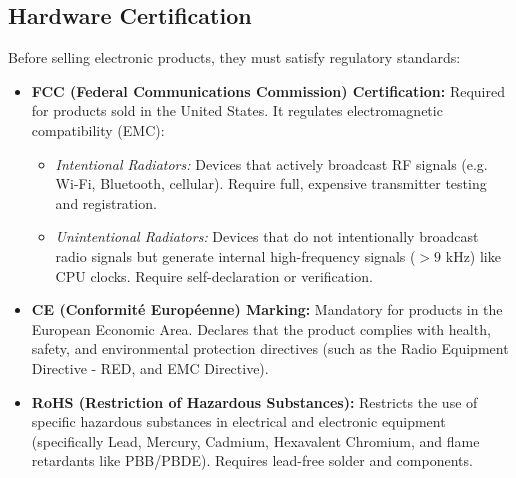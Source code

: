 \documentclass[12pt,a4paper]{article}
\begin{document}
\subsection{Hardware Certification}
Before selling electronic products, they must satisfy regulatory standards:
\begin{itemize}[leftmargin=*, itemsep=3.5pt]
  \item \textbf{FCC (Federal Communications Commission) Certification:} Required for products sold in the United States. It regulates electromagnetic compatibility (EMC):
        \begin{itemize}[leftmargin=*, label=$\bullet$, itemsep=1.0pt]
          \item \textit{Intentional Radiators:} Devices that actively broadcast RF signals (e.g. Wi-Fi, Bluetooth, cellular). Require full, expensive transmitter testing and registration.
          \item \textit{Unintentional Radiators:} Devices that do not intentionally broadcast radio signals but generate internal high-frequency signals ($>9\text{ kHz}$) like CPU clocks. Require self-declaration or verification.
        \end{itemize}
  \item \textbf{CE (Conformité Européenne) Marking:} Mandatory for products in the European Economic Area. Declares that the product complies with health, safety, and environmental protection directives (such as the Radio Equipment Directive - RED, and EMC Directive).
  \item \textbf{RoHS (Restriction of Hazardous Substances):} Restricts the use of specific hazardous substances in electrical and electronic equipment (specifically Lead, Mercury, Cadmium, Hexavalent Chromium, and flame retardants like PBB/PBDE). Requires lead-free solder and components.
\end{itemize}
\end{document}
